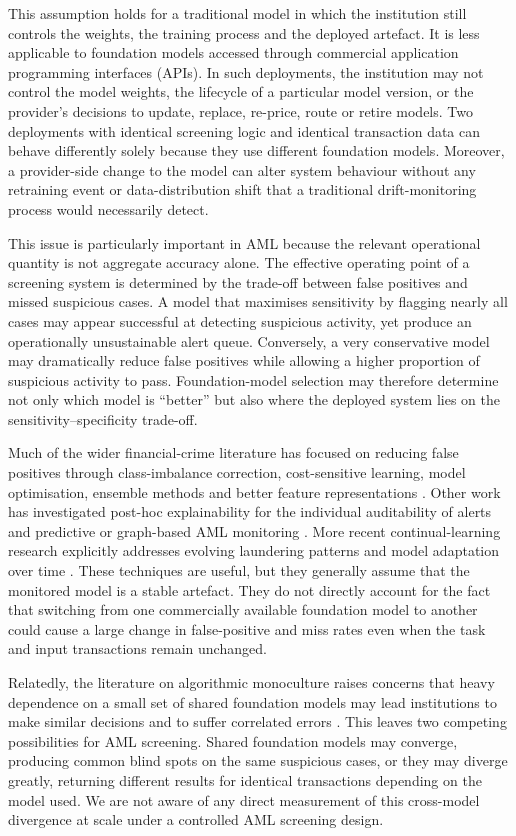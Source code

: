 \documentclass[pdflatex,sn-basic,Numbered]{sn-jnl}
\begin{document}
This assumption holds for a traditional model in which the institution still controls the weights, the training process and the deployed artefact. It is less applicable to foundation models accessed through commercial application programming interfaces (APIs). In such deployments, the institution may not control the model weights, the lifecycle of a particular model version, or the provider's decisions to update, replace, re-price, route or retire models. Two deployments with identical screening logic and identical transaction data can behave differently solely because they use different foundation models. Moreover, a provider-side change to the model can alter system behaviour without any retraining event or data-distribution shift that a traditional drift-monitoring process would necessarily detect.

This issue is particularly important in AML because the relevant operational quantity is not aggregate accuracy alone. The effective operating point of a screening system is determined by the trade-off between false positives and missed suspicious cases. A model that maximises sensitivity by flagging nearly all cases may appear successful at detecting suspicious activity, yet produce an operationally unsustainable alert queue. Conversely, a very conservative model may dramatically reduce false positives while allowing a higher proportion of suspicious activity to pass. Foundation-model selection may therefore determine not only which model is ``better'' but also where the deployed system lies on the sensitivity--specificity trade-off.

Much of the wider financial-crime literature has focused on reducing false positives through class-imbalance correction, cost-sensitive learning, model optimisation, ensemble methods and better feature representations \cite{alhashedi,smote,goecks,imbalance}. Other work has investigated post-hoc explainability for the individual auditability of alerts \cite{shap,lime} and predictive or graph-based AML monitoring \cite{jullum,pourhabibi}. More recent continual-learning research explicitly addresses evolving laundering patterns and model adaptation over time \cite{deprez}. These techniques are useful, but they generally assume that the monitored model is a stable artefact. They do not directly account for the fact that switching from one commercially available foundation model to another could cause a large change in false-positive and miss rates even when the task and input transactions remain unchanged.

Relatedly, the literature on algorithmic monoculture raises concerns that heavy dependence on a small set of shared foundation models may lead institutions to make similar decisions and to suffer correlated errors \cite{homogenization,leviathan,monoculture}. This leaves two competing possibilities for AML screening. Shared foundation models may converge, producing common blind spots on the same suspicious cases, or they may diverge greatly, returning different results for identical transactions depending on the model used. We are not aware of any direct measurement of this cross-model divergence at scale under a controlled AML screening design.
\end{document}
